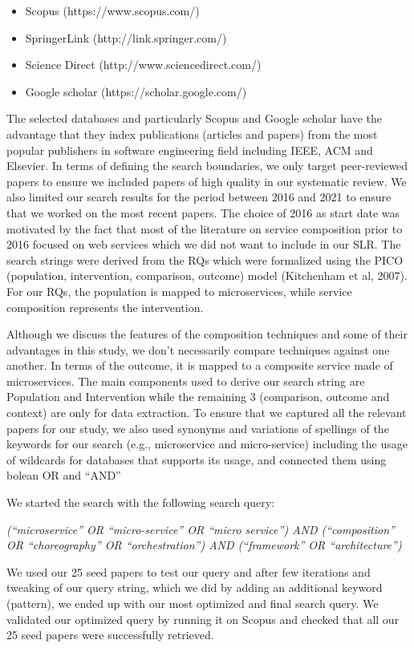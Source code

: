 \documentclass{article}
\begin{document}
\begin{multicols}{2}
\begin{itemize}
\item Scopus (https://www.scopus.com/)
\item SpringerLink (http://link.springer.com/)
\item Science Direct (http://www.sciencedirect.com/)
\item Google scholar (https://scholar.google.com/)
\end{itemize}

The selected databases and particularly Scopus and Google scholar have the advantage that they index publications (articles and papers) from the most popular publishers in software engineering field including IEEE, ACM and Elsevier.
In terms of defining the search boundaries, we only target peer-reviewed papers to ensure we included papers of high quality in our systematic review. We also limited our search results for the period between 2016 and 2021 to ensure that we worked on the most recent papers. The choice of 2016 as start date was motivated by the fact that most of the literature on service composition prior to 2016 focused on web services which we did not want to include in our SLR.
The search strings were derived from the RQs which were formalized using the PICO (population, intervention, comparison, outcome) model (Kitchenham et al, 2007). For our RQs, the population is mapped to microservices, while service composition represents the intervention.

Although we discuss the features of the composition techniques and some of their advantages in this study, we don’t necessarily compare techniques against one another. In terms of the outcome, it is mapped to a composite service made of microservices. The main components used to derive our search string are Population and Intervention while the remaining 3 (comparison, outcome and context) are only for data extraction. To ensure that we captured all the relevant papers for our study, we also used synonyms and variations of spellings of the keywords for our search (e.g., microservice and micro-service) including the usage of wildcards for databases that supports its usage, and connected them using bolean OR and “AND”

We started the search with the following search query: 

\emph{(“microservice” OR “micro-service” OR “micro service”) AND (“composition” OR “choreography” OR “orchestration”) AND (“framework” OR “architecture”)}

We used our 25 seed papers to test our query and after few iterations and tweaking of our query string, which we did by adding an additional keyword (pattern), we ended up with our most optimized and final search query. We validated our optimized query by running it on Scopus and checked that all our 25 seed papers were successfully retrieved.


\end{multicols}
\end{document}
